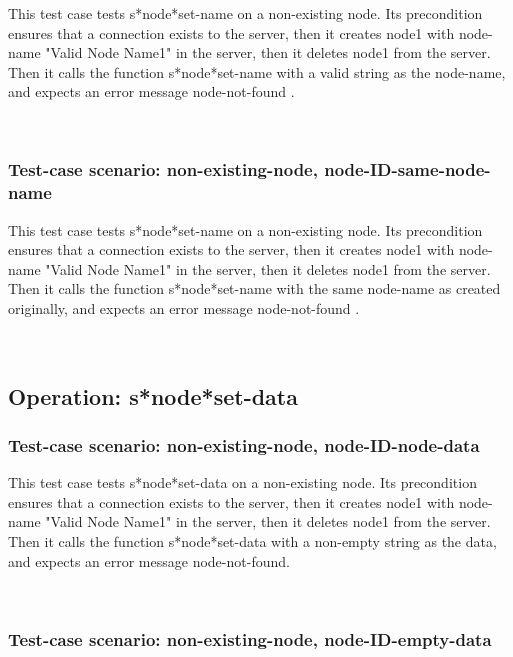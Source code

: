 This test case tests s*node*set-name on a non-existing node.
Its precondition ensures that a connection exists to the server, then it creates node1 with node-name "Valid Node Name1" in the server, then it deletes node1 from the server.
Then it calls the function s*node*set-name  with a valid string as the node-name, and expects an error message node-not-found .





\
\subsubsection {Test-case scenario: non-existing-node, node-ID-same-node-name}


This test case tests s*node*set-name on a non-existing node.
Its precondition ensures that a connection exists to the server, then it creates node1 with node-name "Valid Node Name1" in the server, then it deletes node1 from the server.
Then it calls the function s*node*set-name  with the same node-name as created originally, and expects an error message node-not-found .





\
\subsection {Operation: s*node*set-data}
\subsubsection {Test-case scenario: non-existing-node, node-ID-node-data}


This test case tests s*node*set-data on a non-existing node.
Its precondition ensures that a connection exists to the server, then it creates node1 with node-name "Valid Node Name1" in the server, then it deletes node1 from the server.
Then it calls the function s*node*set-data  with a non-empty string as the data, and expects an error message node-not-found.





\
\subsubsection {Test-case scenario: non-existing-node, node-ID-empty-data}


